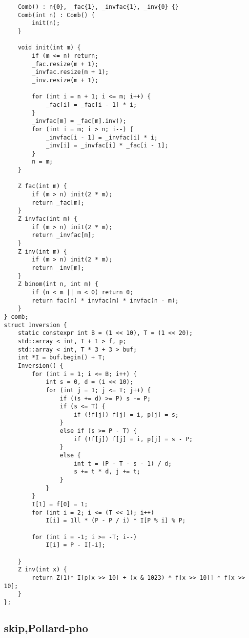 \documentclass[a4paper,10pt]{article}
\begin{document}
\begin{lstlisting}
    Comb() : n{0}, _fac{1}, _invfac{1}, _inv{0} {}
    Comb(int n) : Comb() {
        init(n);
    }

    void init(int m) {
        if (m <= n) return;
        _fac.resize(m + 1);
        _invfac.resize(m + 1);
        _inv.resize(m + 1);

        for (int i = n + 1; i <= m; i++) {
            _fac[i] = _fac[i - 1] * i;
        }
        _invfac[m] = _fac[m].inv();
        for (int i = m; i > n; i--) {
            _invfac[i - 1] = _invfac[i] * i;
            _inv[i] = _invfac[i] * _fac[i - 1];
        }
        n = m;
    }

    Z fac(int m) {
        if (m > n) init(2 * m);
        return _fac[m];
    }
    Z invfac(int m) {
        if (m > n) init(2 * m);
        return _invfac[m];
    }
    Z inv(int m) {
        if (m > n) init(2 * m);
        return _inv[m];
    }
    Z binom(int n, int m) {
        if (n < m || m < 0) return 0;
        return fac(n) * invfac(m) * invfac(n - m);
    }
} comb;
struct Inversion {
    static constexpr int B = (1 << 10), T = (1 << 20);
    std::array < int, T + 1 > f, p;
    std::array < int, T * 3 + 3 > buf;
    int *I = buf.begin() + T;
    Inversion() {
        for (int i = 1; i <= B; i++) {
            int s = 0, d = (i << 10);
            for (int j = 1; j <= T; j++) {
                if ((s += d) >= P) s -= P;
                if (s <= T) {
                    if (!f[j]) f[j] = i, p[j] = s;
                }
                else if (s >= P - T) {
                    if (!f[j]) f[j] = i, p[j] = s - P;
                }
                else {
                    int t = (P - T - s - 1) / d;
                    s += t * d, j += t;
                }
            }
        }
        I[1] = f[0] = 1;
        for (int i = 2; i <= (T << 1); i++)
            I[i] = 1ll * (P - P / i) * I[P % i] % P;

        for (int i = -1; i >= -T; i--)
            I[i] = P - I[-i];

    }
    Z inv(int x) {
        return Z(1)* I[p[x >> 10] + (x & 1023) * f[x >> 10]] * f[x >> 10];
    }
};\end{lstlisting}

\subsection{skip,Pollard-pho}
\thispagestyle{fancy}
\end{document}
